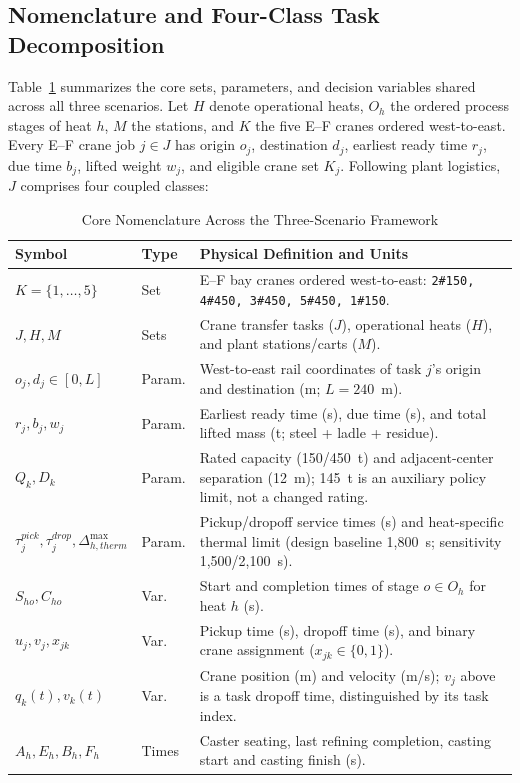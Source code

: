 \documentclass[11pt,a4paper]{article}
\begin{document}
\subsection{Nomenclature and Four-Class Task Decomposition}
Table~\ref{tab:nomenclature} summarizes the core sets, parameters, and decision variables shared across all three scenarios. Let $H$ denote operational heats, $O_h$ the ordered process stages of heat $h$, $M$ the stations, and $K$ the five E--F cranes ordered west-to-east. Every E--F crane job $j \in J$ has origin $o_j$, destination $d_j$, earliest ready time $r_j$, due time $b_j$, lifted weight $w_j$, and eligible crane set $K_j$. Following plant logistics, $J$ comprises four coupled classes:

\begin{table}[htbp]
\centering
\small
\caption{Core Nomenclature Across the Three-Scenario Framework}
\label{tab:nomenclature}
\begin{tabular}{llp{8.4cm}}
\toprule
\textbf{Symbol} & \textbf{Type} & \textbf{Physical Definition and Units} \\
\midrule
$K = \{1,\dots,5\}$ & Set & E--F bay cranes ordered west-to-east: \texttt{2\#150, 4\#450, 3\#450, 5\#450, 1\#150}. \\
$J, H, M$ & Sets & Crane transfer tasks ($J$), operational heats ($H$), and plant stations/carts ($M$). \\
$o_j, d_j \in [0, L]$ & Param. & West-to-east rail coordinates of task $j$'s origin and destination (m; $L=240$~m). \\
$r_j, b_j, w_j$ & Param. & Earliest ready time (s), due time (s), and total lifted mass (t; steel + ladle + residue). \\
$Q_k, D_k$ & Param. & Rated capacity (150/450~t) and adjacent-center separation (12~m); 145~t is an auxiliary policy limit, not a changed rating. \\
$\tau_j^{pick}, \tau_j^{drop}, \Delta_{h,therm}^{\max}$ & Param. & Pickup/dropoff service times (s) and heat-specific thermal limit (design baseline 1,800~s; sensitivity 1,500/2,100~s). \\
$S_{ho}, C_{ho}$ & Var. & Start and completion times of stage $o \in O_h$ for heat $h$ (s). \\
$u_j, v_j, x_{jk}$ & Var. & Pickup time (s), dropoff time (s), and binary crane assignment ($x_{jk} \in \{0,1\}$). \\
$q_k(t), v_k(t)$ & Var. & Crane position (m) and velocity (m/s); $v_j$ above is a task dropoff time, distinguished by its task index. \\
$A_h,E_h,B_h,F_h$ & Times & Caster seating, last refining completion, casting start and casting finish (s). \\
\bottomrule
\end{tabular}
\end{table}
\end{document}
